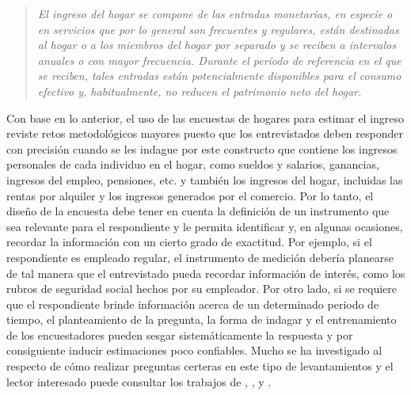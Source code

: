 \begin{quote}
\emph{El ingreso del hogar se compone de las entradas monetarias, en especie o en servicios que por lo general son frecuentes y regulares, están destinadas al hogar o a los miembros del hogar por separado y se reciben a intervalos anuales o con mayor frecuencia. Durante el período de referencia en el que se reciben, tales entradas están potencialmente disponibles para el consumo efectivo y, habitualmente, no reducen el patrimonio neto del hogar.}
\end{quote}

Con base en lo anterior, el uso de las encuestas de hogares para estimar el ingreso reviste retos metodológicos mayores puesto que los entrevistados deben responder con precisión cuando se les indague por este constructo que contiene los ingresos personales de cada individuo en el hogar, como sueldos y salarios, ganancias, ingresos del empleo, pensiones, etc. y también los ingresos del hogar, incluidas las rentas por alquiler y los ingresos generados por el comercio. Por lo tanto, el diseño de la encuesta debe tener en cuenta la definición de un instrumento que sea relevante para el respondiente y le permita identificar y, en algunas ocasiones, recordar la información con un cierto grado de exactitud. Por ejemplo, si el respondiente es empleado regular, el instrumento de medición debería planearse de tal manera que el entrevistado pueda recordar información de interés, como los rubros de seguridad social hechos por su empleador. Por otro lado, si se requiere que el respondiente brinde información acerca de un determinado periodo de tiempo, el planteamiento de la pregunta, la forma de indagar y el entrenamiento de los encuestadores pueden sesgar sistemáticamente la respuesta y por consiguiente inducir estimaciones poco confiables. Mucho se ha investigado al respecto de cómo realizar preguntas certeras en este tipo de levantamientos y el lector interesado puede consultar los trabajos de \citet{Biemer_Lyberg_2003}, \citet{Presser_Rothgeb_Couper_Lessler_Martin_Martin_Singer_2004}, y \citet{Groves_Fowler_Couper_Lepkowski_Singer_Tourangeau_2009}.

